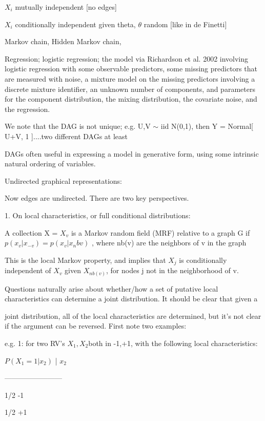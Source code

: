 \documentclass[11pt,a4paper]{article}
\begin{document}
	$X_i$  mutually independent [no edges]
	
	$X_i$ conditionally independent given theta,  $\theta$ random [like in de Finetti]
	
	Markov chain, Hidden Markov chain,
	
	Regression; logistic regression; the model via Richardson et al. 2002 involving logistic regression with some observable predictors, some missing predictors that are measured with noise, a mixture model on the missing predictors involving a discrete mixture identifier, an unknown number of components, and parameters for the component distribution, the mixing distribution, the covariate noise, and the regression.
	
	We note that the DAG is not unique; e.g. U,V $\sim$ iid N(0,1), then Y = Normal[ U+V, 1 ]....two different DAGs at least
	
	DAGs often useful in expressing a model in generative form, using some intrinsic natural ordering of variables.
	
	Undirected graphical representations:
	
	Now edges are undirected.  There are two key perspectives.
	
	1.  On local characteristics, or full conditional distributions:    
	
	A collection X = {$X_v$} is a Markov random field (MRF) relative to a graph G if $p(x_v | x_{-v}) = p( x_v | x_nb{v} )$ ,  where nb(v) are the neighbors of v in the graph
	
	This is the local Markov property, and implies that $X_j$ is conditionally independent of $X_v$ given $X_{nb(v)}$, for nodes j not in the neighborhood of v.
	
	Questions naturally arise about whether/how a set of putative local characteristics can determine a joint distribution.  It should be clear that given a 
	
	joint distribution, all of the local characteristics are determined, but it's not clear if the argument can be reversed.   First note two examples:
	
	e.g. 1:  for two RV's $X_1, X_2 $both in {-1,+1}, with the following local characteristics:
	
	
	
	$P(X_1=1|x_2)$   |  $x_2$
	
	------------------------
	
	1/2               -1
	
	1/2               +1
	
\end{document}
